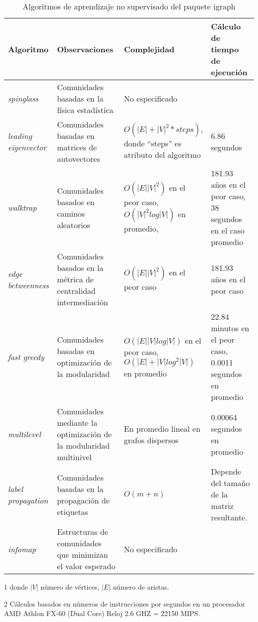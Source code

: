 \begin{table}[tbp]
\centering
\caption{Algoritmos de aprendizaje no supervisado del paquete igraph}
\label{algoritmos_igraph}
\begin{threeparttable}
\begin{tabularx}{\textwidth}{@{}XXXX@{}}
\toprule
Algoritmo & Observaciones & Complejidad\tnote{1}  & Cálculo de tiempo de ejecución\tnote{2} \\ \midrule
\textit{spinglass} & Comunidades basadas en la física estadística & No especificado &  \\
\textit{leading} \newline  \textit{eigenvector} & Comunidades basadas en matrices de autovectores & $O(|E|+|V|^2*steps)$, donde “steps” es atributo del algoritmo & 6.86 segundos \\
\textit{walktrap} & Comunidades basados en caminos aleatorios & $O(|E||V|^2)$ en el peor caso, $O(|V|^2 log|V|)$ en promedio, & 181.93 años en el peor caso, 38 segundos en el caso promedio \\
\textit{edge} \newline \textit{betweenness} & Comunidades basados en la métrica de centralidad intermediación & $O(|E||V|^2)$ en el peor caso & 181.93 años en el peor caso \\
\textit{fast greedy} & Comunidades basadas en optimización de la modularidad & $O(|E||V|log|V|)$ en el peor caso, $O(|E|+|V|log^2|V|)$ en promedio & 22.84 minutos en el peor caso, 0.0011 segundos en promedio \\
\textit{multilevel} & Comunidades mediante la optimización de la modularidad multinivel & En promedio lineal en grafos dispersos & 0.00064 segundos en promedio \\
\textit{label} \newline  \textit{propagation} & Comunidades basadas en la propagación de etiquetas & $O(m+n)$ & Depende del tamaño de la matriz resultante. \\
\textit{infomap} & Estructuras de comunidades que minimizan el valor esperado & No especificado &  \\ \bottomrule
\end{tabularx}
\begin{tablenotes}
    \item[1] donde $|V|$ número de vértices, $|E|$ número de aristas.
    \item[2] Cálculos basados en números de instrucciones por segundos en un procesador AMD Athlon FX-60 (Dual Core) Reloj 2.6 GHZ = 22150 MIPS.
  \end{tablenotes}
\end{threeparttable}
\end{table}

